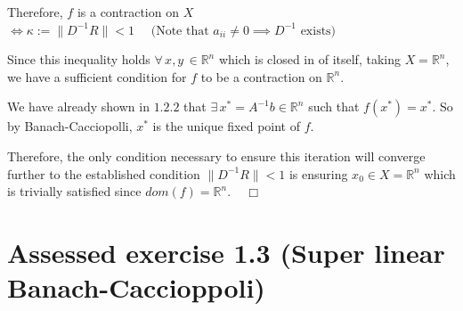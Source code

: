\documentclass[]{article}
\begin{document}
\begin{enumerate}
Therefore, $f$ is a contraction on $X$ $\iff  \kappa := \|D^{-1}R\| < 1 \quad \text{        (Note that $a_{ii} \neq 0 \implies D^{-1}$ exists)
}$\newline 

Since this inequality holds $\forall \, x,y \, \in \mathbb{R}^n$ which is closed in of itself, taking $X=\mathbb{R}^n$, we have a sufficient condition for $f$ to be a contraction on $\mathbb{R}^n$.
        
We have already shown in $1.2.2$ that $\exists \, x^* = A^{-1}b \in \mathbb{R}^n $ such that $f(x^*) = x^*$. So by Banach-Cacciopolli, $x^*$ is the unique fixed point of $f$.

Therefore, the only condition necessary to ensure this iteration will converge further to the established condition $\|D^{-1}R\| < 1$ is ensuring $x_0 \in X=\mathbb{R}^n$ which is trivially satisfied since $dom(f) = \mathbb{R}^n. \, \quad \Box$

\end{enumerate}

\noindent \section*{Assessed exercise 1.3 (Super linear Banach-Caccioppoli)}
\end{document}
